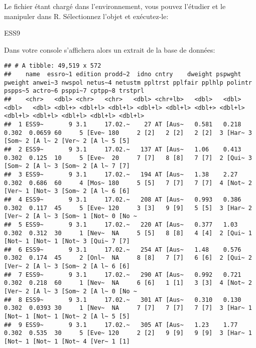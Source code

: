 \documentclass[
]{book}
\newenvironment{Shaded}{\begin{snugshade}}{\end{snugshade}}
\newcommand{\NormalTok}[1]{#1}
\begin{document}
Le fichier étant chargé dans l'environnement, vous pouvez l'étudier et le manipuler dans R. Sélectionnez l'objet et exécutez-le:

\begin{Shaded}
\begin{Highlighting}[]
\NormalTok{ESS9}
\end{Highlighting}
\end{Shaded}

Dans votre console s'affichera alors un extrait de la base de données:

\begin{verbatim}
## # A tibble: 49,519 x 572
##    name  essro~1 edition prodd~2  idno cntry    dweight pspwght pweight anwei~3 nwspol netus~4 netustm ppltrst pplfair pplhlp polintr pspps~5 actro~6 psppi~7 cptpp~8 trstprl
##    <chr>   <dbl> <chr>   <chr>   <dbl> <chr+lb>   <dbl>   <dbl>   <dbl>   <dbl> <dbl+> <dbl+l> <dbl+l> <dbl+l> <dbl+l> <dbl+> <dbl+l> <dbl+l> <dbl+l> <dbl+l> <dbl+l> <dbl+l>
##  1 ESS9~       9 3.1     17.02.~    27 AT [Aus~   0.581   0.218   0.302  0.0659 60     5 [Eve~ 180     2 [2]   2 [2]   2 [2]  3 [Har~ 3 [Som~ 2 [A l~ 2 [Ver~ 2 [A l~ 5 [5]  
##  2 ESS9~       9 3.1     17.02.~   137 AT [Aus~   1.06    0.413   0.302  0.125  10     5 [Eve~  20     7 [7]   8 [8]   7 [7]  2 [Qui~ 3 [Som~ 2 [A l~ 3 [Som~ 2 [A l~ 7 [7]  
##  3 ESS9~       9 3.1     17.02.~   194 AT [Aus~   1.38    2.27    0.302  0.686  60     4 [Mos~ 180     5 [5]   7 [7]   7 [7]  4 [Not~ 2 [Ver~ 1 [Not~ 3 [Som~ 2 [A l~ 6 [6]  
##  4 ESS9~       9 3.1     17.02.~   208 AT [Aus~   0.993   0.386   0.302  0.117  45     5 [Eve~ 120     3 [3]   9 [9]   5 [5]  3 [Har~ 2 [Ver~ 2 [A l~ 3 [Som~ 1 [Not~ 0 [No ~
##  5 ESS9~       9 3.1     17.02.~   220 AT [Aus~   0.377   1.03    0.302  0.312  30     1 [Nev~  NA     5 [5]   8 [8]   4 [4]  2 [Qui~ 1 [Not~ 1 [Not~ 1 [Not~ 3 [Qui~ 7 [7]  
##  6 ESS9~       9 3.1     17.02.~   254 AT [Aus~   1.48    0.576   0.302  0.174  45     2 [Onl~  NA     8 [8]   7 [7]   6 [6]  2 [Qui~ 2 [Ver~ 2 [A l~ 3 [Som~ 2 [A l~ 6 [6]  
##  7 ESS9~       9 3.1     17.02.~   290 AT [Aus~   0.992   0.721   0.302  0.218  60     1 [Nev~  NA     6 [6]   1 [1]   3 [3]  4 [Not~ 2 [Ver~ 2 [A l~ 3 [Som~ 2 [A l~ 0 [No ~
##  8 ESS9~       9 3.1     17.02.~   301 AT [Aus~   0.310   0.130   0.302  0.0393 30     1 [Nev~  NA     7 [7]   7 [7]   7 [7]  3 [Har~ 1 [Not~ 1 [Not~ 1 [Not~ 2 [A l~ 5 [5]  
##  9 ESS9~       9 3.1     17.02.~   305 AT [Aus~   1.23    1.77    0.302  0.535  30     5 [Eve~ 120     2 [2]   9 [9]   9 [9]  3 [Har~ 1 [Not~ 1 [Not~ 1 [Not~ 4 [Ver~ 1 [1]  

\end{verbatim}
\end{document}

